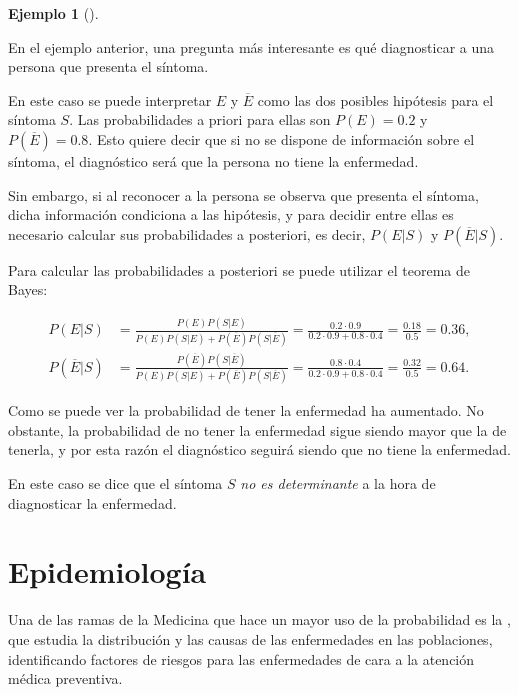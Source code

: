 \documentclass[
  a4paper,
]{scrreport}
\theoremstyle{plain}
\theoremstyle{definition}
\newtheorem{example}{Ejemplo}[chapter]
\theoremstyle{definition}
\theoremstyle{remark}
\begin{document}
\begin{example}[]\protect\hypertarget{exm-teorema-bayes}{}\label{exm-teorema-bayes}

En el ejemplo anterior, una pregunta más interesante es qué diagnosticar
a una persona que presenta el síntoma.

En este caso se puede interpretar \(E\) y \(\overline{E}\) como las dos
posibles hipótesis para el síntoma \(S\). Las probabilidades a priori
para ellas son \(P(E)=0.2\) y \(P(\overline E)=0.8\). Esto quiere decir
que si no se dispone de información sobre el síntoma, el diagnóstico
será que la persona no tiene la enfermedad.

Sin embargo, si al reconocer a la persona se observa que presenta el
síntoma, dicha información condiciona a las hipótesis, y para decidir
entre ellas es necesario calcular sus probabilidades a posteriori, es
decir, \(P(E|S)\) y \(P(\overline{E}|S)\).

Para calcular las probabilidades a posteriori se puede utilizar el
teorema de Bayes:

\begin{align*}
P(E|S) &= \frac{P(E)P(S|E)}{P(E)P(S|E)+P(\overline{E})P(S|\overline{E})} = \frac{0.2\cdot 0.9}{0.2\cdot 0.9 + 0.8\cdot 0.4} = \frac{0.18}{0.5}=0.36,\\
P(\overline{E}|S) &= \frac{P(\overline{E})P(S|\overline{E})}{P(E)P(S|E)+P(\overline{E})P(S|\overline{E})} = \frac{0.8\cdot 0.4}{0.2\cdot 0.9 + 0.8\cdot 0.4} = \frac{0.32}{0.5}=0.64.
\end{align*}

Como se puede ver la probabilidad de tener la enfermedad ha aumentado.
No obstante, la probabilidad de no tener la enfermedad sigue siendo
mayor que la de tenerla, y por esta razón el diagnóstico seguirá siendo
que no tiene la enfermedad.

En este caso se dice que el síntoma \(S\) \emph{no es determinante} a la
hora de diagnosticar la enfermedad.

\end{example}

\section{Epidemiología}\label{epidemiologuxeda}

Una de las ramas de la Medicina que hace un mayor uso de la probabilidad
es la , que estudia la distribución y las causas de las enfermedades en
las poblaciones, identificando factores de riesgos para las enfermedades
de cara a la atención médica preventiva.
\end{document}
